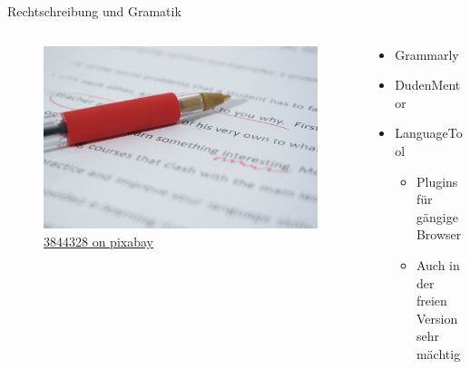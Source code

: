 \begin{frame}{Rechtschreibung und Gramatik}
    \begin{columns}[t]
        \begin{column}{0.4\textwidth}
            \vspace{-2em} 
            \begin{figure}
                \begin{flushleft}
                    \includegraphics[height=0.6\textheight,trim={8cm 10 2cm 0},clip]{graphics/correcting-1870721_1280.jpg}
                    \caption*{\href{https://pixabay.com/photos/correcting-proof-paper-correction-1870721/}{3844328 on pixabay}}    
                \end{flushleft}                
            \end{figure}
            
        \end{column}
        \begin{column}{0.6\textwidth}
            \begin{itemize}
                \item Grammarly
                \item DudenMentor
                \item LanguageTool
                \begin{itemize}
                    \item Plugins für gängige Browser
                    \item Auch in der freien Version sehr mächtig
                \end{itemize}
            \end{itemize}
        \end{column}
    \end{columns}
\end{frame}


